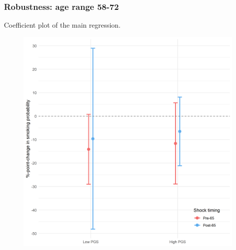 \documentclass[10pt,compress,xcolor=dvipsnames,aspectratio=169]{beamer}    %
\newcounter{ex}
\newcommand{\1}[1]{\mathrm{1\hspace*{-2.5pt}l}[#1]}	%
\begin{document}
\begin{frame}
\frametitle{Robustness: age range 58-72}
Coefficient plot of the main regression.
\begin{figure}[hbtp]

\centering
\includegraphics[height=0.8\textheight]{../../3_output/shock_effects/robustness_5872_100_cv.png}
\label{fig:coeffplot58-72}
\end{figure}
\hyperlink{frame:robustness}{}
\end{frame}
\end{document}
